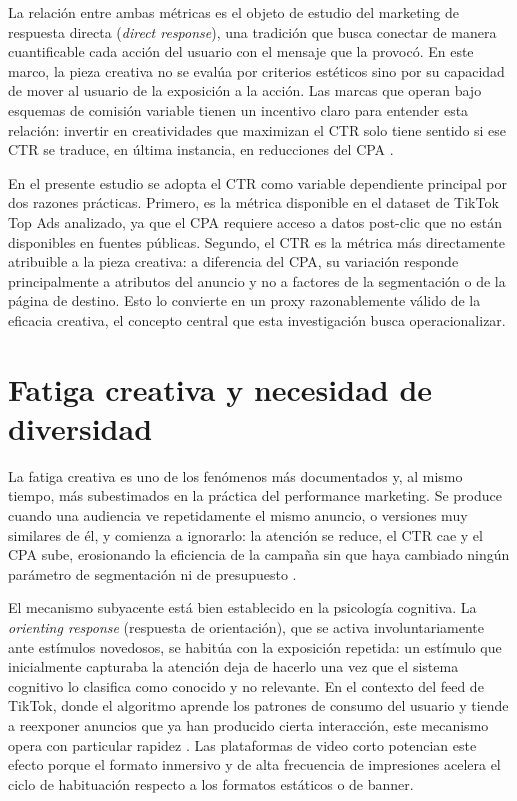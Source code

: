 \documentclass[12pt, a4paper]{report}
\begin{document}
La relación entre ambas métricas es el objeto de estudio del marketing de respuesta directa
(\textit{direct response}), una tradición que busca conectar de manera cuantificable cada acción
del usuario con el mensaje que la provocó. En este marco, la pieza creativa no se evalúa por
criterios estéticos sino por su capacidad de mover al usuario de la exposición a la acción. Las
marcas que operan bajo esquemas de comisión variable tienen un incentivo claro para entender esta
relación: invertir en creatividades que maximizan el CTR solo tiene sentido si ese CTR se traduce,
en última instancia, en reducciones del CPA \citep{kantar2023}.

En el presente estudio se adopta el CTR como variable dependiente principal por dos razones prácticas.
Primero, es la métrica disponible en el dataset de TikTok Top Ads analizado, ya que el CPA requiere acceso
a datos post-clic que no están disponibles en fuentes públicas. Segundo, el CTR es la métrica más
directamente atribuible a la pieza creativa: a diferencia del CPA, su variación responde principalmente
a atributos del anuncio y no a factores de la segmentación o de la página de destino. Esto lo convierte
en un proxy razonablemente válido de la eficacia creativa, el concepto central que esta investigación
busca operacionalizar.

\section{Fatiga creativa y necesidad de diversidad}

La fatiga creativa es uno de los fenómenos más documentados y, al mismo tiempo, más subestimados
en la práctica del performance marketing. Se produce cuando una audiencia ve repetidamente el mismo
anuncio, o versiones muy similares de él, y comienza a ignorarlo: la atención se reduce, el CTR cae
y el CPA sube, erosionando la eficiencia de la campaña sin que haya cambiado ningún parámetro de
segmentación ni de presupuesto \citep{singular2025}.

El mecanismo subyacente está bien establecido en la psicología cognitiva. La \textit{orienting
response} (respuesta de orientación), que se activa involuntariamente ante estímulos novedosos, se
habitúa con la exposición repetida: un estímulo que inicialmente capturaba la atención deja de
hacerlo una vez que el sistema cognitivo lo clasifica como conocido y no relevante. En el contexto
del feed de TikTok, donde el algoritmo aprende los patrones de consumo del usuario y tiende a
reexponer anuncios que ya han producido cierta interacción, este mecanismo opera con particular
rapidez \citep{tiktok_audiovisual2025}. Las plataformas de video corto potencian este efecto porque
el formato inmersivo y de alta frecuencia de impresiones acelera el ciclo de habituación respecto a
los formatos estáticos o de banner.
\end{document}
